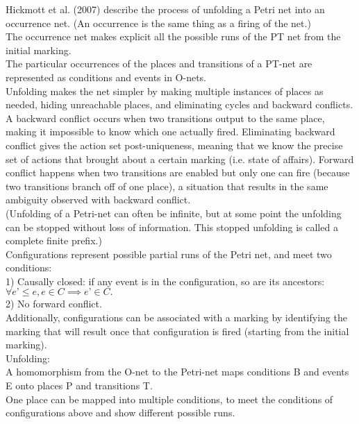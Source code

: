 Hickmott et al. (2007) describe the process of unfolding a Petri net into an occurrence net. (An occurrence is the same thing as a firing of the net.)\\

The occurrence net makes explicit all the possible runs of the PT net from the initial marking.\\

The particular occurrences of the places and transitions of a PT-net are represented as conditions and events in O-nets. \\ 


Unfolding makes the net simpler by making multiple instances of places as needed, hiding unreachable places, and eliminating cycles and backward conflicts. A backward conflict occurs when two transitions output to the same place, making it impossible to know which one actually fired. Eliminating backward conflict gives the action set post-uniqueness, meaning that we know the precise set of actions that brought about a certain marking (i.e. state of affairs). Forward conflict happens when two transitions are enabled but only one can fire (because two transitions branch off of one place), a situation that results in the same ambiguity observed with backward conflict. \\

(Unfolding of a Petri-net can often be infinite, but at some point the unfolding can be stopped without loss of information. This stopped unfolding is called a complete finite prefix.)\\

Configurations represent possible partial runs of the Petri net, and meet two conditions:\\
1) Causally closed: if any event is in the configuration, so are its ancestors: $ \forall e’ \leq e, e \in C \implies e’ \in C.$\\
2) No forward conflict.\\
Additionally, configurations can be associated with a marking by identifying the marking that will result once that configuration is fired (starting from the initial marking).\\

Unfolding:\\

A homomorphism from the O-net to the Petri-net maps conditions B and events E onto places P and transitions T.\\
One place can be mapped into multiple conditions, to meet the conditions of configurations above and show different possible runs.\\ 

